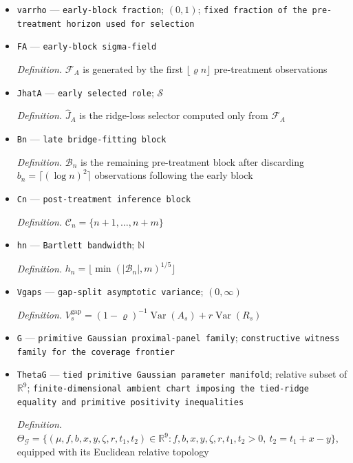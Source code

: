 \documentclass{article}
\begin{document}
\begin{itemize}
  \item \texttt{varrho} --- \texttt{early-\allowbreak{}block fraction}; \((0,1)\); \texttt{fixed fraction of the pre-\allowbreak{}treatment horizon used for selection}
  \item \texttt{FA} --- \texttt{early-\allowbreak{}block sigma-\allowbreak{}field}
  \par\smallskip\noindent\emph{Definition.} \(\mathcal F_A\) is generated by the first \(\lfloor\varrho n\rfloor\) pre-treatment observations
  \item \texttt{JhatA} --- \texttt{early selected role}; \(\mathcal S\)
  \par\smallskip\noindent\emph{Definition.} \(\widehat J_A\) is the ridge-loss selector computed only from \(\mathcal F_A\)
  \item \texttt{Bn} --- \texttt{late bridge-\allowbreak{}fitting block}
  \par\smallskip\noindent\emph{Definition.} \(\mathcal B_n\) is the remaining pre-treatment block after discarding \(b_n=\lceil(\log n)^2\rceil\) observations following the early block
  \item \texttt{Cn} --- \texttt{post-\allowbreak{}treatment inference block}
  \par\smallskip\noindent\emph{Definition.} \(\mathcal C_n=\{n+1,\ldots,n+m\}\)
  \item \texttt{hn} --- \texttt{Bartlett bandwidth}; \(\mathbb N\)
  \par\smallskip\noindent\emph{Definition.} \(h_n=\lfloor\min(|\mathcal B_n|,m)^{1/5}\rfloor\)
  \item \texttt{Vgaps} --- \texttt{gap-\allowbreak{}split asymptotic variance}; \((0,\infty)\)
  \par\smallskip\noindent\emph{Definition.} \(V_s^{\mathrm{gap}}=(1-\varrho)^{-1}\operatorname{Var}(A_s)+r\operatorname{Var}(R_s)\)
  \item \texttt{G} --- \texttt{primitive Gaussian proximal-\allowbreak{}panel family}; \texttt{constructive witness family for the coverage frontier}
  \item \texttt{ThetaG} --- \texttt{tied primitive Gaussian parameter manifold}; relative subset of \(\mathbb R^9\); \texttt{finite-\allowbreak{}dimensional ambient chart imposing the tied-\allowbreak{}ridge equality and primitive positivity inequalities}
  \par\smallskip\noindent\emph{Definition.} \(\Theta_{\mathcal G}=\{(\mu,f,b,x,y,\zeta,r,t_1,t_2)\in\mathbb R^9:f,b,x,y,\zeta,r,t_1,t_2>0,\ t_2=t_1+x-y\}\), equipped with its Euclidean relative topology

\end{itemize}
\end{document}
